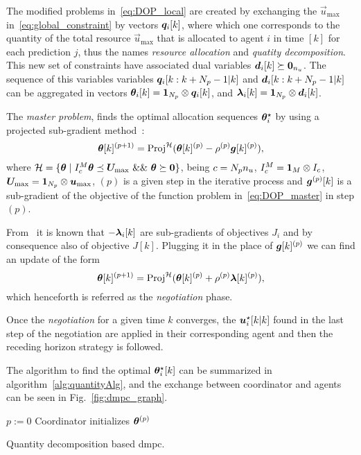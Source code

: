 \documentclass{ifacconf}  %
\begin{document}
The modified \mpc{} problems in~\eqref{eq:DOP_local} are created by exchanging the $\vec{u}_{\max}$ in~\eqref{eq:global_constraint} by vectors $\qik$, where which one corresponds to the quantity of the total resource $\vec{u}_{\max}$ that is allocated to agent $i$ in time $[k]$ for each prediction $j$, thus the names \emph{resource allocation} and \emph{quatity decomposition}. This new set of constraints have associated dual variables ${\dik\succeq\0_{n_{u}}}$. The sequence of this variables variables ${\qiseq}$ and ${\diseq}$ can be aggregated in vectors ${\thetaik=\kron{\1_{\predhorz}}{\qik}}$, and ${\lambdaik=\kron{\1_{\predhorz}}{\dik}}$.

The \emph{master problem}, finds the optimal allocation sequences $\boldsymbol{\theta}_i^{\star}$ by using a projected sub-gradient method~\citep{BoydVandenberghe2004}:
\begin{equation}
  \label{eq:projectedSubgradient}
\boldsymbol{\theta}[k]^{(p+1)}=\operatorname{Proj}^{\mathcal{H}}(\boldsymbol{\theta}[k]^{(p)}-\rho^{(p)}\boldsymbol{g}[k]^{(p)}),
\end{equation}
where ${\set{H} = \setbuild{\vec{\theta}}{I_{c}^{M}\vec{\theta}\preceq \vec{U}_{\max}\ \&\&\ \vec{\theta}\succeq\0 }}$, being ${c=N_{p} n_{u}}$, ${I_{c}^{M}=\mathbf{1}_{M}\mathbin{\otimes}I_{c}}$, ${\boldsymbol{U}_{\max}=\mathbf{1}_{N_{p}}\mathbin{\otimes}\boldsymbol{u}_{\max}}$, $(p)$ is a given step in the iterative process and $\boldsymbol{g}^{(p)}[k]$ is a sub-gradient of the objective of the function problem in~\eqref{eq:DOP_master} in step $(p)$.

From~\cite{BoydEtAl2015} it is known that $-\lambdaik$ are sub-gradients of objectives $J_{i}$ and by consequence also of objective $J[k]$.
Plugging it in the place of $\boldsymbol{g}[k]^{(p)}$ we can find an update of the form
\begin{equation}
  \label{eq:thetaNegot}
\boldsymbol{\theta}[k]^{(p+1)}=\operatorname{Proj}^{\mathcal{H}}(\boldsymbol{\theta}[k]^{(p)}+\rho^{(p)}\boldsymbol{\lambda}[k]^{(p)}),
\end{equation}
which henceforth is referred as the \emph{negotiation} phase.

Once the \emph{negotiation} for a given time $k$ converges, the $\optuikk$ found in the last step of the negotiation are applied in their corresponding agent and then the receding horizon strategy is followed.

The algorithm to find the optimal $\boldsymbol{\theta}_i^{\star}[k]$ can be summarized in algorithm~\ref{alg:quantityAlg}, and the exchange between coordinator and agents can be seen in Fig.~\ref{fig:dmpc_graph}.

\begin{algorithm2e}[h]
  \DontPrintSemicolon%
  $p:=0$\;
  Coordinator initializes $\boldsymbol{\theta}^{(p)}$ \;
 \caption{Quantity decomposition based \acrlong{dmpc}.}\label{alg:quantityAlg}
\end{algorithm2e}
\end{document}
